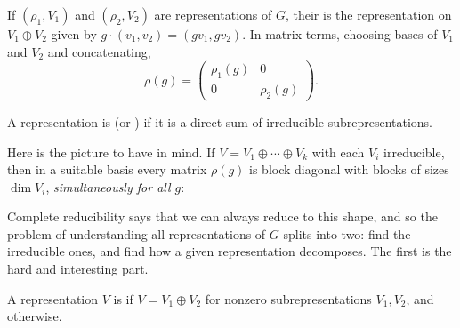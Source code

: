 \documentclass[a4paper]{scrartcl}
\begin{document}
\begin{definition}
	If $(\rho_1, V_1)$ and $(\rho_2, V_2)$ are representations of $G$, their  is the representation on $V_1 \oplus V_2$ given by $g \cdot (v_1, v_2) = (g v_1, g v_2)$. In matrix terms, choosing bases of $V_1$ and $V_2$ and concatenating,
	$$\rho(g) = \begin{pmatrix} \rho_1(g) & 0 \\ 0 & \rho_2(g)\end{pmatrix}.$$
\end{definition}

\begin{definition}
	A representation is  (or ) if it is a direct sum of irreducible subrepresentations.
\end{definition}

Here is the picture to have in mind. If $V = V_1 \oplus \cdots \oplus V_k$ with each $V_i$ irreducible, then in a suitable basis every matrix $\rho(g)$ is block diagonal with blocks of sizes $\dim V_i$, \emph{simultaneously for all $g$}:

\begin{center}
\end{center}
\vspace{0.4em}

Complete reducibility says that we can always reduce to this shape, and so the problem of understanding all representations of $G$ splits into two: find the irreducible ones, and find how a given representation decomposes. The first is the hard and interesting part.

\begin{definition}[Decomposable]
	A representation $V$ is  if $V = V_1 \oplus V_2$ for nonzero subrepresentations $V_1, V_2$, and  otherwise.
\end{definition}
\end{document}
